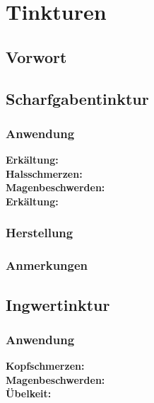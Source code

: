 \chapter{Tinkturen}

\section{Vorwort}

\lipsum[1-5]
\newpage


\section{Scharfgabentinktur}

\subsection{Anwendung}

\textbf{Erkältung:} \\ 

\textbf{Halsschmerzen:} \\ 

\textbf{Magenbeschwerden:} \\ 

\textbf{Erkältung:} \\ 


\subsection{Herstellung}

\subsection{Anmerkungen}



\section{Ingwertinktur}

\subsection{Anwendung}

\textbf{Kopfschmerzen:} \\ 

\textbf{Magenbeschwerden:} \\ 

\textbf{Übelkeit:} \\ 

